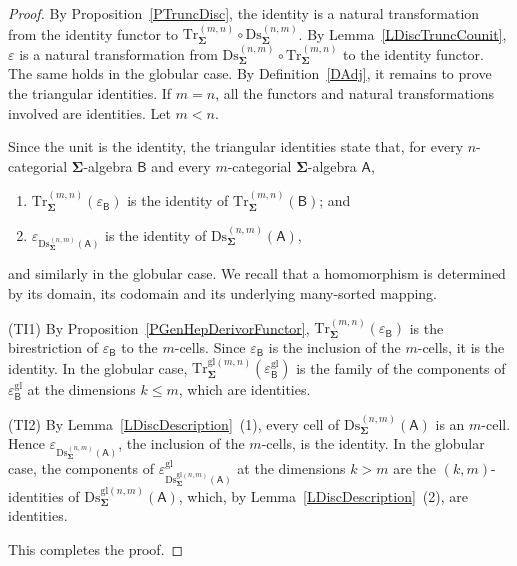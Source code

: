 \documentclass[a4paper, reqno
]{amsart}
\newcommand{\sig}[1]{\mathbf{#1}}             %
\newcommand{\calg}[1]{\boldsymbol{\mathsf{#1}}} %
\newcommand{\gl}{\mathrm{gl}}                %
\newcommand{\Ds}{\mathrm{Ds}}
\newcommand{\Tr}{\mathrm{Tr}}
\theoremstyle{plain}
\theoremstyle{definition}
\begin{document}
\begin{proof}
By Proposition~\ref{PTruncDisc}, the identity is a natural transformation from the identity functor to $\Tr^{(m,n)}_{\sig{\Sigma}}\circ\Ds^{(n,m)}_{\sig{\Sigma}}$.
By Lemma~\ref{LDiscTruncCounit}, $\varepsilon$ is a natural transformation from $\Ds^{(n,m)}_{\sig{\Sigma}}\circ\Tr^{(m,n)}_{\sig{\Sigma}}$ to the identity functor.
The same holds in the globular case.
By Definition~\ref{DAdj}, it remains to prove the triangular identities.
If $m=n$, all the functors and natural transformations involved are identities.
Let $m<n$.

Since the unit is the identity, the triangular identities state that, for every $n$-categorial $\sig{\Sigma}$-algebra $\calg{B}$ and every $m$-categorial $\sig{\Sigma}$-algebra $\calg{A}$,
\begin{enumerate}
	\item[(TI1)]
	$\Tr^{(m,n)}_{\sig{\Sigma}}(\varepsilon_{\calg{B}})$ is the identity of $\Tr^{(m,n)}_{\sig{\Sigma}}(\calg{B})$; and

	\item[(TI2)]
	$\varepsilon_{\Ds^{(n,m)}_{\sig{\Sigma}}(\calg{A})}$ is the identity of $\Ds^{(n,m)}_{\sig{\Sigma}}(\calg{A})$,
\end{enumerate}
and similarly in the globular case.
We recall that a homomorphism is determined by its domain, its codomain and its underlying many-sorted mapping.

(TI1) By Proposition~\ref{PGenHepDerivorFunctor}, $\Tr^{(m,n)}_{\sig{\Sigma}}(\varepsilon_{\calg{B}})$ is the birestriction of $\varepsilon_{\calg{B}}$ to the $m$-cells.
Since $\varepsilon_{\calg{B}}$ is the inclusion of the $m$-cells, it is the identity.
In the globular case, $\Tr^{\gl(m,n)}_{\sig{\Sigma}}(\varepsilon^{\gl}_{\calg{B}})$ is the family of the components of $\varepsilon^{\gl}_{\calg{B}}$ at the dimensions $k\leq m$, which are identities.

(TI2) By Lemma~\ref{LDiscDescription}~(1), every cell of $\Ds^{(n,m)}_{\sig{\Sigma}}(\calg{A})$ is an $m$-cell.
Hence $\varepsilon_{\Ds^{(n,m)}_{\sig{\Sigma}}(\calg{A})}$, the inclusion of the $m$-cells, is the identity.
In the globular case, the components of $\varepsilon^{\gl}_{\Ds^{\gl(n,m)}_{\sig{\Sigma}}(\calg{A})}$ at the dimensions $k>m$ are the $(k,m)$-identities of $\Ds^{\gl(n,m)}_{\sig{\Sigma}}(\calg{A})$, which, by Lemma~\ref{LDiscDescription}~(2), are identities.

This completes the proof.
\end{proof}
\end{document}
